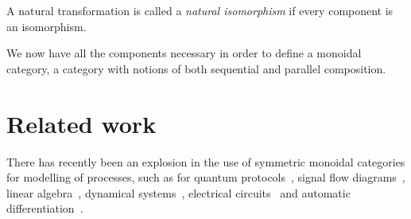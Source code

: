 \begin{definition}
    A natural transformation is called a \emph{natural isomorphism} if every
    component is an isomorphism.
\end{definition}

We now have all the components necessary in order to define a monoidal category,
a category with notions of both sequential and parallel composition.

\section{Related work}

There has recently been an explosion in the use of symmetric monoidal categories
for modelling of processes, such as for quantum
protocols~\cite{abramsky2004categorical}, signal flow
diagrams~\cite{bonchi2014categorical,bonchi2015full}, linear
algebra~\cite{bonchi2017interacting,zanasi2015interacting,bonchi2019graphical,boisseau2022graphical},
dynamical systems~\cite{baez2015categories,fong2016categorical}, electrical
circuits~\cite{boisseau2022string} and automatic
differentiation~\cite{alvarez-picallo2023functorial}.